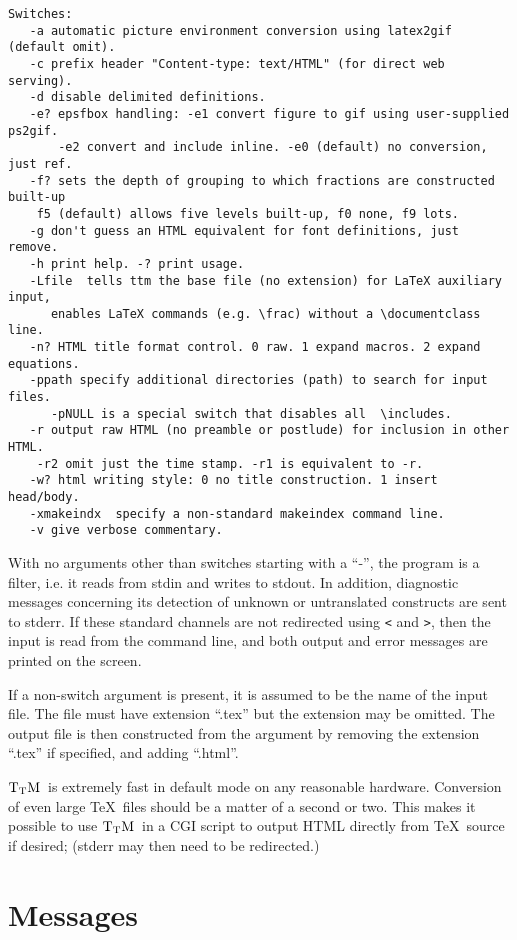 \documentclass[12pt]{article}
\def\TtM{$\rm{}T_TH$}
\def\TtM{$\rm{}T_TM$}%
\begin{document}
{\begin{verbatim}
Switches:
   -a automatic picture environment conversion using latex2gif (default omit). 
   -c prefix header "Content-type: text/HTML" (for direct web serving).
   -d disable delimited definitions.
   -e? epsfbox handling: -e1 convert figure to gif using user-supplied ps2gif.
       -e2 convert and include inline. -e0 (default) no conversion, just ref. 
   -f? sets the depth of grouping to which fractions are constructed built-up
    f5 (default) allows five levels built-up, f0 none, f9 lots. 
   -g don't guess an HTML equivalent for font definitions, just remove.
   -h print help. -? print usage.
   -Lfile  tells ttm the base file (no extension) for LaTeX auxiliary input, 
      enables LaTeX commands (e.g. \frac) without a \documentclass line.
   -n? HTML title format control. 0 raw. 1 expand macros. 2 expand equations.
   -ppath specify additional directories (path) to search for input files.
      -pNULL is a special switch that disables all  \includes.
   -r output raw HTML (no preamble or postlude) for inclusion in other HTML.
	-r2 omit just the time stamp. -r1 is equivalent to -r.
   -w? html writing style: 0 no title construction. 1 insert head/body.
   -xmakeindx  specify a non-standard makeindex command line.
   -v give verbose commentary. 
\end{verbatim}
\fi
 }
With no arguments other than switches starting with a ``-'', 
the program is a filter, i.e. it reads from stdin and writes to stdout.
In addition, diagnostic messages concerning its detection of unknown
or untranslated constructs are sent to stderr. If these standard
channels are not redirected using \verb!<! and \verb!>!, then the
input is read from the command line, and both output and error
messages are printed on the screen.

If a non-switch argument is present, it is assumed to be the name of
the input file. The file must have extension ``.tex'' but the extension
may be omitted. The output file is then constructed from the argument
by removing the extension ``.tex'' if specified, and adding ``.html''.

\TtM\ is extremely fast in default mode on any reasonable hardware.
Conversion of even large \TeX\ files should be a matter of a second or
two.
This makes it possible to use \TtM\ in a CGI script to output HTML
directly from \TeX\ source if desired; (stderr may then need to be redirected.)


\section{Messages}
\end{document}
